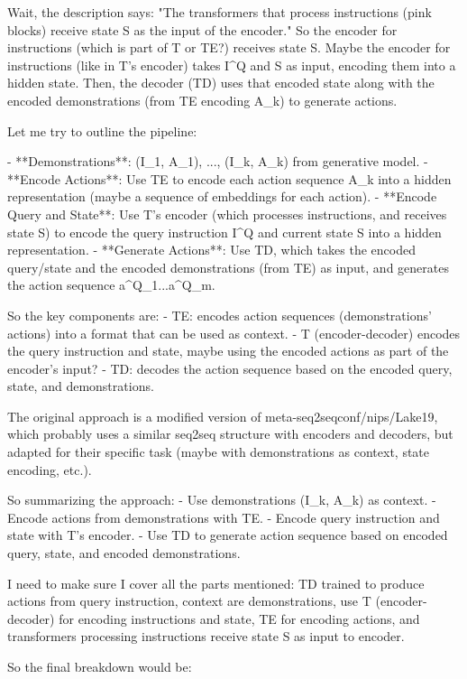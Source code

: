 Wait, the description says: "The transformers that process instructions (pink blocks) receive state S as the input of the encoder." So the encoder for instructions (which is part of T or TE?) receives state S. Maybe the encoder for instructions (like in T's encoder) takes I^Q and S as input, encoding them into a hidden state. Then, the decoder (TD) uses that encoded state along with the encoded demonstrations (from TE encoding A_k) to generate actions.

Let me try to outline the pipeline:

- **Demonstrations**: (I_1, A_1), ..., (I_k, A_k) from generative model.
- **Encode Actions**: Use TE to encode each action sequence A_k into a hidden representation (maybe a sequence of embeddings for each action).
- **Encode Query and State**: Use T's encoder (which processes instructions, and receives state S) to encode the query instruction I^Q and current state S into a hidden representation.
- **Generate Actions**: Use TD, which takes the encoded query/state and the encoded demonstrations (from TE) as input, and generates the action sequence a^Q_1...a^Q_m.

So the key components are:
- TE: encodes action sequences (demonstrations' actions) into a format that can be used as context.
- T (encoder-decoder) encodes the query instruction and state, maybe using the encoded actions as part of the encoder's input?
- TD: decodes the action sequence based on the encoded query, state, and demonstrations.

The original approach is a modified version of meta-seq2seqconf/nips/Lake19, which probably uses a similar seq2seq structure with encoders and decoders, but adapted for their specific task (maybe with demonstrations as context, state encoding, etc.).

So summarizing the approach:
- Use demonstrations (I_k, A_k) as context.
- Encode actions from demonstrations with TE.
- Encode query instruction and state with T's encoder.
- Use TD to generate action sequence based on encoded query, state, and encoded demonstrations.

I need to make sure I cover all the parts mentioned: TD trained to produce actions from query instruction, context are demonstrations, use T (encoder-decoder) for encoding instructions and state, TE for encoding actions, and transformers processing instructions receive state S as input to encoder.

So the final breakdown would be:

